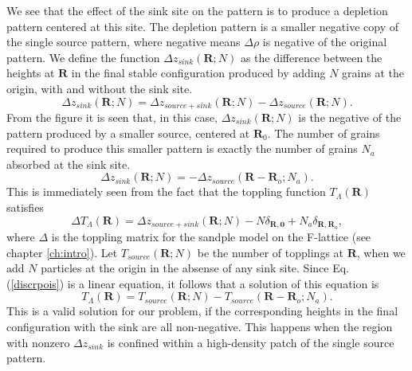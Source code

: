 \documentclass[11pt,a4paper]{book}
\begin{document}
We see that the effect of the sink site on the pattern is to produce a
depletion pattern centered at this site. The depletion pattern
is a smaller negative copy of the single source pattern, where
negative means $\Delta\rho$ is negative of the original pattern. We define the function
$\Delta z_{sink}\left( \mathbf{R}; N \right)$ as the difference between
the heights at ${\mathbf R}$ in the final stable configuration produced
by adding $N$ grains at the origin, with and without the sink site. 
\begin{equation}
\Delta z_{sink} \left( \mathbf{R}; N \right)= \Delta z_{source+sink}\left( {\mathbf R}; N \right)- \Delta z_{source}\left( \mathbf{R}; N \right). 
\end{equation}
From the figure it is seen that, in this case, $\Delta z_{sink}\left( \mathbf{R}; N \right)$
is the negative of the pattern produced by a smaller source, centered at $\mathbf{R}_0$.
The number of grains required to produce this smaller pattern is exactly the number of grains
$N_a$ absorbed at the sink site.
\begin{equation}
\Delta z_{sink}\left( \mathbf{R}; N \right)= - \Delta z_{source}\left( \mathbf{R}-\mathbf{R}_{o}; N_{a} \right).
\label{zsink}
\end{equation}
This is immediately seen from the fact that the 
toppling function $T_\Lambda\left( \mathbf{R} \right)$ satisfies 
\begin{equation}
\Delta T_{\Lambda}\left( \mathbf{R} \right)=\Delta z_{source+sink}\left( \mathbf{R}; N \right)-N \delta_{\mathbf{R}, \mathbf{0}} + N_{a}\delta_{\mathbf{R}, \mathbf{R}_{o}},
\label{discrpois}
\end{equation}
where  $\Delta$ is the toppling matrix for the sandple model on the
F-lattice (see chapter \ref{ch:intro}).
Let $T_{source} ({\mathbf R}; N)$ be the number of topplings at ${\mathbf R}$, when we
add $N$ particles at the origin in the absense of any sink site. Since Eq. (\ref{discrpois}) is  a linear equation,
it follows that a solution of this equation is
\begin{equation}
T_{\Lambda}\left( \mathbf{R} \right)=T_{source}\left( \mathbf{R}; N \right)-T_{source}\left( \mathbf{R}-\mathbf{R}_{o}; N_{a} \right).
\label{lcomb}
\end{equation}
This is a valid solution for our problem, if the corresponding heights in the final configuration with the sink are all non-negative.
This happens when the region with nonzero $\Delta z_{sink}$ is confined within a high-density patch of the single
source pattern.
\end{document}
